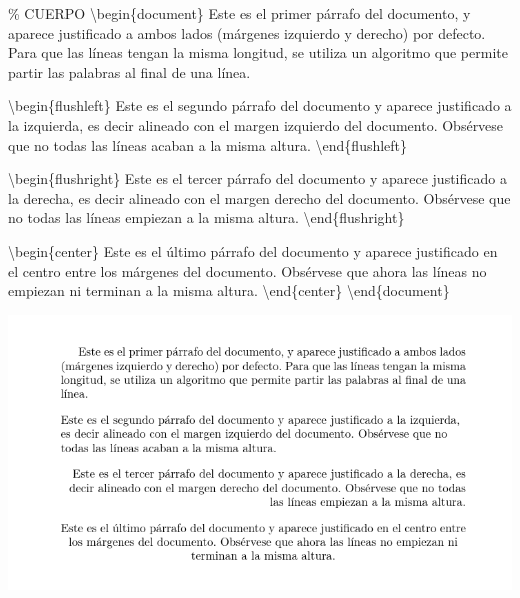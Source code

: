 \documentclass[
  letterpaper,
  DIV=11,
  numbers=noendperiod]{scrreport}
\newenvironment{Shaded}{\begin{snugshade}}{\end{snugshade}}
\newcommand{\CommentTok}[1]{\textcolor[rgb]{0.37,0.37,0.37}{#1}}
\newcommand{\ExtensionTok}[1]{\textcolor[rgb]{0.00,0.23,0.31}{#1}}
\newcommand{\KeywordTok}[1]{\textcolor[rgb]{0.00,0.23,0.31}{#1}}
\newcommand{\NormalTok}[1]{\textcolor[rgb]{0.00,0.23,0.31}{#1}}
\begin{document}
\begin{Shaded}
\begin{Highlighting}[]
\CommentTok{\% CUERPO}
\KeywordTok{\textbackslash{}begin}\NormalTok{\{}\ExtensionTok{document}\NormalTok{\}}
\NormalTok{Este es el primer párrafo del documento, y aparece justificado a ambos lados (márgenes izquierdo y derecho) por defecto. Para que las líneas tengan la misma longitud, se utiliza un algoritmo que permite partir las palabras al final de una línea.}

\KeywordTok{\textbackslash{}begin}\NormalTok{\{}\ExtensionTok{flushleft}\NormalTok{\}}
\NormalTok{Este es el segundo párrafo del documento y aparece justificado a la izquierda, es decir alineado con el margen izquierdo del documento. Obsérvese que no todas las líneas acaban a la misma altura.}
\KeywordTok{\textbackslash{}end}\NormalTok{\{}\ExtensionTok{flushleft}\NormalTok{\}}

\KeywordTok{\textbackslash{}begin}\NormalTok{\{}\ExtensionTok{flushright}\NormalTok{\}}
\NormalTok{Este es el tercer párrafo del documento y aparece justificado a la derecha, es decir alineado con el margen derecho del documento. Obsérvese que no todas las líneas empiezan a la misma altura.}
\KeywordTok{\textbackslash{}end}\NormalTok{\{}\ExtensionTok{flushright}\NormalTok{\}}

\KeywordTok{\textbackslash{}begin}\NormalTok{\{}\ExtensionTok{center}\NormalTok{\}}
\NormalTok{Este es el último párrafo del documento y aparece justificado en el centro entre los márgenes del documento. Obsérvese que ahora las líneas no empiezan ni terminan a la misma altura. }
\KeywordTok{\textbackslash{}end}\NormalTok{\{}\ExtensionTok{center}\NormalTok{\}}
\KeywordTok{\textbackslash{}end}\NormalTok{\{}\ExtensionTok{document}\NormalTok{\}}
\end{Highlighting}
\end{Shaded}

\begin{tcolorbox}[enhanced jigsaw, opacitybacktitle=0.6, coltitle=black, colbacktitle=quarto-callout-note-color!10!white, title={Salida}, colback=white, toprule=.15mm, breakable, opacityback=0, left=2mm, rightrule=.15mm, toptitle=1mm, colframe=quarto-callout-note-color-frame, bottomtitle=1mm, titlerule=0mm, arc=.35mm, bottomrule=.15mm, leftrule=.75mm]
\includegraphics{./img/secciones/justificacion.png}
\end{tcolorbox}
\end{document}
